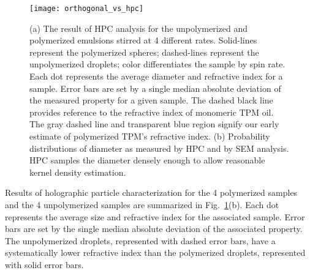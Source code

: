 
\begin{figure}
    \centering
    \texttt{[image: orthogonal\_vs\_hpc]}
    \caption{(a) The result of HPC analysis for the unpolymerized and polymerized
      emulsions stirred at \num{4} different rates. Solid-lines represent the polymerized
      spheres; dashed-lines represent the unpolymerized droplets; color differentiates
      the sample by spin rate. Each dot represents the
      average diameter and refractive index for a sample. Error bars are set by a single
      median absolute deviation of the measured property for a given sample. The dashed
      black line provides reference to the refractive index of monomeric TPM oil. The gray
      dashed line and transparent blue region signify our early estimate of polymerized
      TPM's refractive index. (b) Probability distributions of diameter as measured by
      HPC and by SEM analysis. HPC samples the diameter densely enough to allow
      reasonable kernel density estimation.}
    \label{fig:hpc_stir_rate}
\end{figure}


Results of holographic particle characterization for the \num{4} polymerized samples
and the \num{4} unpolymerized samples are summarized in Fig.~\ref{fig:hpc_stir_rate}(b).
Each dot represents the average size and refractive index for the associated sample.
Error bars are set by the single median absolute deviation of the associated property.
The unpolymerized droplets, represented with dashed error bars, have a systematically
lower refractive index than the polymerized droplets, represented with solid error bars.

